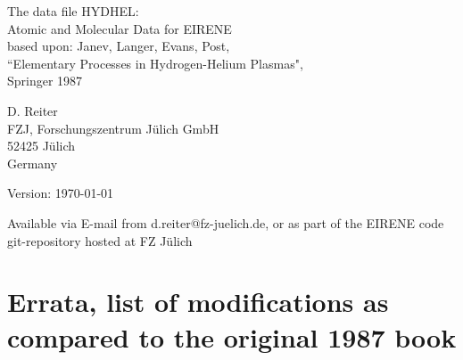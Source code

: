 \documentclass[12pt,dvipdfmx]{article}
\begin{document}
\parindent 0pt
{\LARGE \bf \center
\vspace*{3truecm}

The data file HYDHEL: \\
Atomic and Molecular Data for EIRENE \\
based upon: Janev, Langer, Evans, Post, \\
``Elementary
Processes in Hydrogen-Helium Plasmas", \\
Springer 1987
\vspace*{3truecm}

D. Reiter \\
FZJ, Forschungszentrum J\"ulich GmbH \\
52425 J\"ulich \\
Germany
\vspace{3truecm}

Version: \today
\vspace{1truecm}

Available via E-mail from d.reiter@fz-juelich.de, or as part of the
EIRENE code git-repository hosted at FZ J\"ulich
}
\newpage
\renewcommand\thesection{\Roman{section}}
\newpage
{}
\tableofcontents
\newpage
\section{Errata, list of modifications as compared to the original 1987 book \cite{kn:Janev87}}
\end{document}
